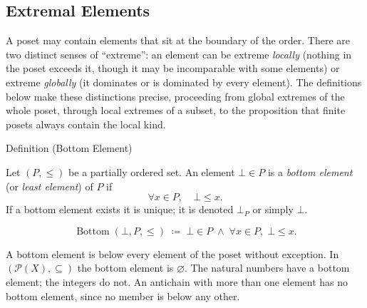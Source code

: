 
\subsection{Extremal Elements}
\label{sec:extremal-elements}

\begin{remark*}
A poset may contain elements that sit at the boundary of the order.  There
are two distinct senses of ``extreme'': an element can be extreme
\emph{locally} (nothing in the poset exceeds it, though it may be
incomparable with some elements) or extreme \emph{globally} (it dominates
or is dominated by every element).  The definitions below make these
distinctions precise, proceeding from global extremes of the whole poset,
through local extremes of a subset, to the proposition that finite posets
always contain the local kind.
\end{remark*}


\begin{definitionbox}{Definition (Bottom Element)}
\begin{definition}
\label{def:bottom-element}
Let $(P, \leq)$ be a partially ordered set.  An element $\bot \in P$ is
a \emph{bottom element} (or \emph{least element}) of $P$ if
\[
\forall x \in P, \quad \bot \leq x.
\]
If a bottom element exists it is unique; it is denoted $\bot_P$ or
simply $\bot$.
\end{definition}
\end{definitionbox}

\begin{remark*}
\[
\operatorname{Bottom}(\bot, P, \leq)
\;\coloneqq\;
\bot \in P \;\land\; \forall x \in P,\; \bot \leq x.
\]
\end{remark*}

\begin{remark*}[Interpretation]
A bottom element is below every element of the poset without exception.
In $(\mathcal{P}(X), \subseteq)$ the bottom element is $\varnothing$.
The natural numbers have a bottom element; the integers do not.
An antichain with more than one element has no bottom element, since no
member is below any other.
\end{remark*}

